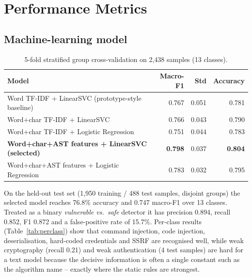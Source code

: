 \documentclass[11pt,a4paper,twoside]{report}
\begin{document}
\section{Performance Metrics}

\subsection{Machine-learning model}
\begin{table}[H]
\centering\small
\begin{tabular}{lrrr}
\toprule
Model & Macro-F1 & Std & Accuracy\\
\midrule
Word TF-IDF + LinearSVC (prototype-style baseline) & 0.767 & 0.051 & 0.781\\
Word+char TF-IDF + LinearSVC & 0.766 & 0.043 & 0.790\\
Word+char TF-IDF + Logistic Regression & 0.751 & 0.044 & 0.783\\
\textbf{Word+char+AST features + LinearSVC (selected)} & \textbf{0.798} & 0.037 & \textbf{0.804}\\
Word+char+AST features + Logistic Regression & 0.783 & 0.032 & 0.795\\
\bottomrule
\end{tabular}
\caption{5-fold stratified group cross-validation on 2{,}438 samples (13 classes).}
\end{table}

On the held-out test set (1{,}950 training / 488 test samples, disjoint groups) the selected model reaches 76.8\% accuracy and 0.747 macro-F1 over 13 classes. Treated as a binary \emph{vulnerable vs.\ safe} detector it has precision 0.894, recall 0.852, F1 0.872 and a false-positive rate of 15.7\%. Per-class results (Table~\ref{tab:perclass}) show that command injection, code injection, deserialisation, hard-coded credentials and SSRF are recognised well, while weak cryptography (recall 0.21) and weak authentication (4 test samples) are hard for a text model because the decisive information is often a single constant such as the algorithm name -- exactly where the static rules are strongest.
\end{document}
